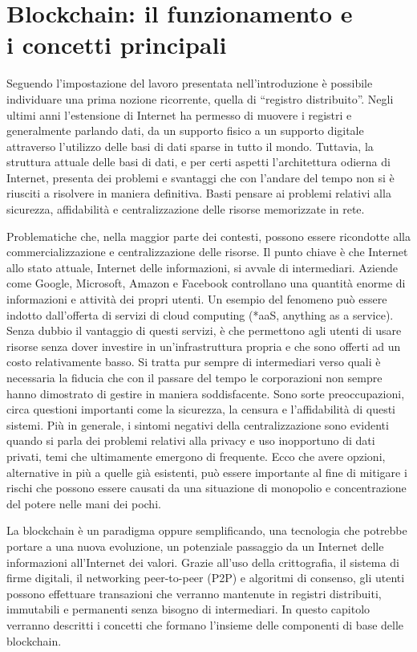 \chapter{Blockchain: il funzionamento e\\ i concetti principali}
\label{ch:blockchain}

Seguendo l’impostazione del lavoro presentata nell’introduzione è possibile individuare una prima nozione ricorrente, quella di “registro distribuito”. Negli ultimi anni l’estensione di Internet ha permesso di muovere i registri e generalmente parlando dati, da un supporto fisico a un supporto digitale attraverso l’utilizzo delle basi di dati sparse in tutto il mondo. Tuttavia, la struttura attuale delle basi di dati, e per certi aspetti l’architettura odierna di Internet, presenta dei problemi e svantaggi che con l’andare del tempo non si è riusciti a risolvere in maniera definitiva. Basti pensare ai problemi relativi alla sicurezza, affidabilità e centralizzazione delle risorse memorizzate in rete.

Problematiche che, nella maggior parte dei contesti, possono essere ricondotte alla commercializzazione e centralizzazione delle risorse. Il punto chiave è che Internet allo stato attuale, Internet delle informazioni, si avvale di intermediari. Aziende come Google, Microsoft, Amazon e Facebook controllano una quantità enorme di informazioni e attività dei propri utenti. Un esempio del fenomeno può essere indotto dall’offerta di servizi di cloud computing (*aaS, anything as a service). Senza dubbio il vantaggio di questi servizi, è che permettono agli utenti di usare risorse senza dover investire in un’infrastruttura propria e che sono offerti ad un costo relativamente basso. Si tratta pur sempre di intermediari verso quali è necessaria la fiducia che con il passare del tempo le corporazioni non sempre hanno dimostrato di gestire in maniera soddisfacente. Sono sorte preoccupazioni, circa questioni importanti come la sicurezza, la censura e l'affidabilità di questi sistemi. Più in generale, i sintomi negativi della centralizzazione sono evidenti quando si parla dei problemi relativi alla privacy e uso inopportuno di dati privati, temi che ultimamente emergono di frequente. Ecco che avere opzioni, alternative in più a quelle già esistenti, può essere importante al fine di mitigare i rischi che possono essere causati da una situazione di monopolio e concentrazione del potere nelle mani dei pochi.

La blockchain è un paradigma oppure semplificando, una tecnologia che potrebbe portare a una nuova evoluzione, un potenziale passaggio da un Internet delle informazioni all’Internet dei valori. Grazie all’uso della crittografia, il sistema di firme digitali, il networking peer-to-peer (P2P) e algoritmi di consenso, gli utenti possono effettuare transazioni che verranno mantenute in registri distribuiti, immutabili e permanenti senza bisogno di intermediari. In questo capitolo verranno descritti i concetti che formano l’insieme delle componenti di base delle blockchain.


